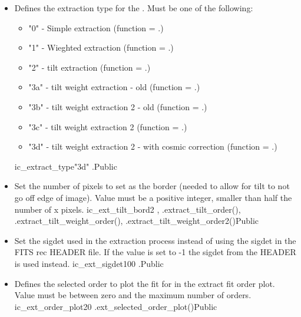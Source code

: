 \begin{itemize}
\item {} 
{Defines the extraction type for the \calextractRAW. Must be one of the following:
\begin{itemize}
	\item "0" - Simple extraction (function = \spirouEXTOR.)
	\item "1" - Wieghted extraction (function = \spirouEXTOR.)
	\item "2" - tilt extraction (function = \spirouEXTOR.)
	\item "3a" - tilt weight extraction - old (function = \spirouEXTOR.)
	\item "3b" - tilt weight extraction 2 - old (function = \spirouEXTOR.)
	\item "3c" - tilt weight extraction 2 (function = \spirouEXTOR.)
	\item "3d" - tilt weight extraction 2 - with cosmic correction (function = \spirouEXTOR.)
\end{itemize}
}
{ic\_extract\_type}{"3d"}
{\calextractRAW}{\constantsfile}{\calextractRAW.\progMAIN}{Public}

\item {}
{Set the number of pixels to set as the border (needed to allow for tilt to not go off edge of image). Value must be a positive integer, smaller than half the number of x pixels.}
{ic\_ext\_tilt\_bord}{2}
{\calextractRAW, \calFFraw}{\constantsfile}{\spirouEXTOR.extract\_tilt\_order(), \spirouEXTOR.extract\_tilt\_weight\_order(), \spirouEXTOR.extract\_tilt\_weight\_order2()}{Public}

\item {} 
{Set the sigdet used in the extraction process instead of using the sigdet in the FITS rec HEADER file. If the value is set to -1 the sigdet from the HEADER is used instead.}
{ic\_ext\_sigdet}{100}
{\calextractRAW}{\constantsfile}{\calextractRAW.\progMAIN}{Public}

\item {}
{Defines the selected order to plot the fit for in the extract fit order plot. Value must be between zero and the maximum number of orders.}
{ic\_ext\_order\_plot}{20}
{\calextractRAW}{\constantsfile}{\spirouPlot.ext\_selected\_order\_plot()}{Public}



\end{itemize}
